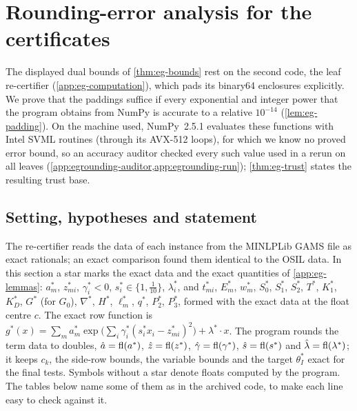 \section{Rounding-error analysis for the  certificates}\label{app:egrounding}

The displayed dual bounds of \cref{thm:eg-bounds} rest on the second code, the leaf re-certifier (\cref{app:eg-computation}), which pads its binary64 enclosures explicitly.
We prove that the paddings suffice if every exponential and integer power that the program obtains from NumPy is accurate to a relative $10^{-14}$ (\cref{lem:eg-padding}).
On the machine used, NumPy~2.5.1 evaluates these functions with Intel SVML routines (through its AVX-512 loops), for which we know no proved error bound, so an accuracy auditor checked every such value used in a rerun on all leaves (\cref{app:egrounding-auditor,app:egrounding-run}); \cref{thm:eg-trust} states the resulting trust base.

\subsection{Setting, hypotheses and statement}\label{app:egrounding-setting}

The re-certifier reads the data of each instance from the MINLPLib GAMS file as exact rationals; an exact comparison found them identical to the OSIL data.
In this section a star marks the exact data and the exact quantities of \cref{app:eg-lemmas}: $a^*_m$, $z^*_{mi}$, $\gamma^*_i<0$, $s^*_i\in\{1,\frac1{10}\}$, $\lambda^*_i$, and $t^*_{mi}$, $E^*_m$, $w^*_m$, $S_0^*$, $S_1^*$, $S_2^*$, $T^*$, $K_1^*$, $K_D^*$, $G^*$ (for $G_0$), $\nabla^*$, $H^*$, $\ell^*_m$, $q^*$, $P_2^*$, $P_3^*$, formed with the exact data at the float centre $c$.
The exact row function is $g^*(x)=\sum_ma^*_m\exp\bigl(\sum_i\gamma^*_i(s^*_ix_i-z^*_{mi})^2\bigr)+\lambda^*\cdot x$.
The program rounds the term data to doubles, $\hat a=\operatorname{fl}(a^*)$, $\hat z=\operatorname{fl}(z^*)$, $\hat\gamma=\operatorname{fl}(\gamma^*)$, $\hat s=\operatorname{fl}(s^*)$ and $\hat\lambda=\operatorname{fl}(\lambda^*)$; it keeps $c_k$, the side-row bounds, the variable bounds and the target $\theta^*_I$ exact for the final tests.
Symbols without a star denote floats computed by the program.
The tables below name some of them as in the archived code, to make each line easy to check against it.

